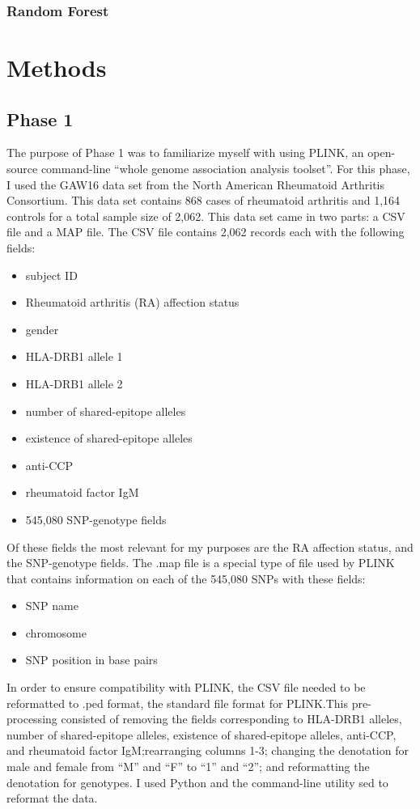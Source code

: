 \documentclass[12pt]{report}
\begin{document}
\subsection{Random Forest}


\chapter{Methods}
\section{Phase 1}
The purpose of Phase 1 was to familiarize myself with using PLINK, an open-source
command-line ``whole genome association analysis toolset''\cite{Chang}. For this
phase, I used the GAW16 data set from the North American Rheumatoid Arthritis
Consortium. This data set contains 868 cases of rheumatoid arthritis and 1,164 
controls for a total sample size of 2,062. This data set came in two parts: 
a CSV file and a MAP file. The CSV file contains 2,062 records each with the 
following fields:
\begin{itemize}
    \item{subject ID}
    \item{Rheumatoid arthritis (RA) affection status}
    \item{gender}
    \item{HLA-DRB1 allele 1}
    \item{HLA-DRB1 allele 2}
    \item{number of shared-epitope alleles}
    \item{existence of shared-epitope alleles}
    \item{anti-CCP}
    \item{rheumatoid factor IgM}
    \item{545,080 SNP-genotype fields}
\end{itemize}
Of these fields the most relevant for my purposes are the RA affection status,
and the SNP-genotype fields. The .map file is a special type of file used by
PLINK that contains information on each of the 545,080 SNPs with these fields:
\begin{itemize}
    \item{SNP name}
    \item{chromosome}
    \item{SNP position in base pairs}
\end{itemize}

In order to ensure compatibility with PLINK, the CSV file needed to be
reformatted to .ped format, the standard file format for PLINK.\@ This
pre-processing consisted of removing the fields corresponding to HLA-DRB1
alleles, number of shared-epitope alleles, existence of shared-epitope alleles,
anti-CCP, and rheumatoid factor IgM;\@ rearranging columns 1-3; changing the
denotation for male and female from ``M'' and ``F'' to ``1'' and ``2''; and
reformatting the denotation for genotypes. I used Python and the command-line
utility sed to reformat the data.
\end{document}
